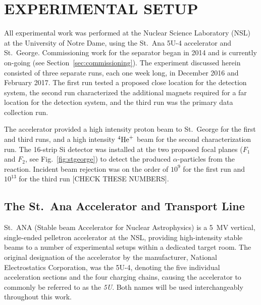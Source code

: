 \chapter{EXPERIMENTAL SETUP}
\label{ch:02-experimental-setup}


All experimental work was performed at the Nuclear Science Laboratory (NSL) at
the University of Notre Dame, using the St.\ Ana 5U-4 accelerator and
St.\ George. Commissioning work for the separator began in 2014 and is
currently on-going (see Section~\ref{sec:commissioning}). The experiment discussed
herein consisted of three separate runs, each one week long, in December 2016
and February 2017. The first run tested a proposed close location for the
detection system, the second run characterized the additional magnets required
for a far location for the detection system, and the third run was the primary
data collection run.

The accelerator provided a high intensity proton beam to St.\ George for the
first and third runs, and a high intensity ${}^{4}\textrm{He}^{+}$ beam for the
second characterization run. The 16-strip Si detector was installed at the two
proposed focal planes ($F_1$ and $F_2$, see Fig.~\ref{fig:stgeorge}) to detect
the produced $\alpha$-particles from the \alpa{} reaction. Incident beam
rejection was on the order of $10^9$ for the first run and $10^{13}$ for the
third run [CHECK THESE NUMBERS].


\section{The St.\ Ana Accelerator and Transport Line}
\label{sec:ch02-5U}

St.\ ANA (Stable beam Accelerator for Nuclear Astrophysics) is a 5~MV vertical,
single-ended pelletron accelerator at the NSL, providing high-intensity stable
beams to a number of experimental setups within a dedicated target room. The
original designation of the accelerator by the manufacturer, National
Electrostatics Corporation, was the 5U-4, denoting the five individual
acceleration sections and the four charging chains, causing the accelerator to
commonly be referred to as the \textit{5U}. Both names will be used
interchangeably throughout this work.

